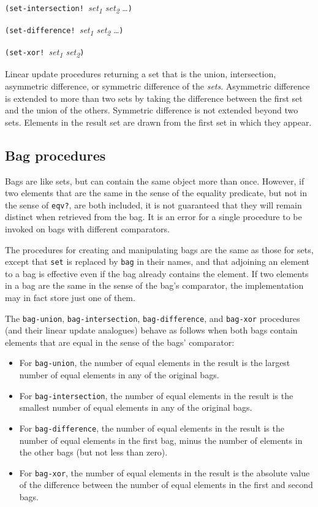 \texttt{(set-intersection!\ }\emph{set\textsubscript{1}
set\textsubscript{2}} \ldots{}\texttt{)}

\texttt{(set-difference!\ }\emph{set\textsubscript{1}
set\textsubscript{2}} \ldots{}\texttt{)}

\texttt{(set-xor!\ }\emph{set\textsubscript{1}
set\textsubscript{2}}\texttt{)}

Linear update procedures returning a set that is the union,
intersection, asymmetric difference, or symmetric difference of the
\emph{sets}. Asymmetric difference is extended to more than two sets by
taking the difference between the first set and the union of the others.
Symmetric difference is not extended beyond two sets. Elements in the
result set are drawn from the first set in which they appear.

\subsection{Bag procedures}\label{Bagprocedures}

Bags are like sets, but can contain the same object more than once.
However, if two elements that are the same in the sense of the equality
predicate, but not in the sense of \texttt{eqv?}, are both included, it
is not guaranteed that they will remain distinct when retrieved from the
bag. It is an error for a single procedure to be invoked on bags with
different comparators.

The procedures for creating and manipulating bags are the same as those
for sets, except that \texttt{set} is replaced by \texttt{bag} in their
names, and that adjoining an element to a bag is effective even if the
bag already contains the element. If two elements in a bag are the same
in the sense of the bag's comparator, the implementation may in fact
store just one of them.

The \texttt{bag-union}, \texttt{bag-intersection},
\texttt{bag-difference}, and \texttt{bag-xor} procedures (and their
linear update analogues) behave as follows when both bags contain
elements that are equal in the sense of the bags' comparator:

\begin{itemize}
\item
  For \texttt{bag-union}, the number of equal elements in the result is
  the largest number of equal elements in any of the original bags.
\item
  For \texttt{bag-intersection}, the number of equal elements in the
  result is the smallest number of equal elements in any of the original
  bags.
\item
  For \texttt{bag-difference}, the number of equal elements in the
  result is the number of equal elements in the first bag, minus the
  number of elements in the other bags (but not less than zero).
\item
  For \texttt{bag-xor}, the number of equal elements in the result is
  the absolute value of the difference between the number of equal
  elements in the first and second bags.
\end{itemize}

